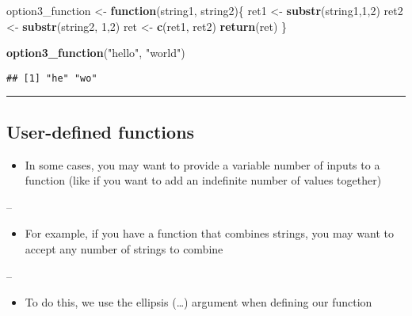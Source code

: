 \documentclass[]{article}
\newenvironment{Shaded}{\begin{snugshade}}{\end{snugshade}}
\newcommand{\ControlFlowTok}[1]{\textcolor[rgb]{0.13,0.29,0.53}{\textbf{#1}}}
\newcommand{\DecValTok}[1]{\textcolor[rgb]{0.00,0.00,0.81}{#1}}
\newcommand{\KeywordTok}[1]{\textcolor[rgb]{0.13,0.29,0.53}{\textbf{#1}}}
\newcommand{\NormalTok}[1]{#1}
\newcommand{\StringTok}[1]{\textcolor[rgb]{0.31,0.60,0.02}{#1}}
\providecommand{\tightlist}{%
  \setlength{\itemsep}{0pt}\setlength{\parskip}{0pt}}
\begin{document}
\begin{Shaded}
\begin{Highlighting}[]
\NormalTok{option3_function <-}\StringTok{ }\ControlFlowTok{function}\NormalTok{(string1, string2)\{}
\NormalTok{  ret1 <-}\StringTok{ }\KeywordTok{substr}\NormalTok{(string1,}\DecValTok{1}\NormalTok{,}\DecValTok{2}\NormalTok{)}
\NormalTok{  ret2 <-}\StringTok{ }\KeywordTok{substr}\NormalTok{(string2, }\DecValTok{1}\NormalTok{,}\DecValTok{2}\NormalTok{)}
\NormalTok{  ret <-}\StringTok{ }\KeywordTok{c}\NormalTok{(ret1, ret2)}
  \KeywordTok{return}\NormalTok{(ret)}
\NormalTok{\}}

\KeywordTok{option3_function}\NormalTok{(}\StringTok{"hello"}\NormalTok{, }\StringTok{"world"}\NormalTok{)}
\end{Highlighting}
\end{Shaded}

\begin{verbatim}
## [1] "he" "wo"
\end{verbatim}

\begin{center}\rule{0.5\linewidth}{\linethickness}\end{center}

\hypertarget{user-defined-functions}{%
\subsection{User-defined functions}\label{user-defined-functions}}

\begin{itemize}
\tightlist
\item
  In some cases, you may want to provide a variable number of inputs to
  a function (like if you want to add an indefinite number of values
  together)
\end{itemize}

--

\begin{itemize}
\tightlist
\item
  For example, if you have a function that combines strings, you may
  want to accept any number of strings to combine
\end{itemize}

--

\begin{itemize}
\tightlist
\item
  To do this, we use the ellipsis (\ldots) argument when defining our
  function
\end{itemize}
\end{document}

